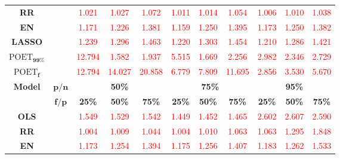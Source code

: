 \begin{table}[ht!]
{\begin{tabular*}{\textwidth}{@{\extracolsep{\fill}}ccccccccccc@{}}
\textbf{RR} &  & \textcolor{red}{1.021} & \textcolor{red}{1.027} & \textcolor{red}{1.072} & \textcolor{red}{1.011} & \textcolor{red}{1.014} & \textcolor{red}{1.054} & \textcolor{red}{1.006} & \textcolor{red}{1.010} & \textcolor{red}{1.038} \\
\textbf{EN} &  & \textcolor{red}{1.171} & \textcolor{red}{1.226} & \textcolor{red}{1.381} & \textcolor{red}{1.159} & \textcolor{red}{1.250} & \textcolor{red}{1.395} & \textcolor{red}{1.173} & \textcolor{red}{1.250} & \textcolor{red}{1.382} \\
\textbf{LASSO} &  & \textcolor{red}{1.239} & \textcolor{red}{1.296} & \textcolor{red}{1.463} & \textcolor{red}{1.220} & \textcolor{red}{1.303} & \textcolor{red}{1.454} & \textcolor{red}{1.210} & \textcolor{red}{1.286} & \textcolor{red}{1.421} \\
\textbf{$\text{POET}_{\bm{99\%}}$} &  & \textcolor{red}{12.794} & \textcolor{red}{1.582} & \textcolor{red}{1.937} & \textcolor{red}{5.515} & \textcolor{red}{1.669} & \textcolor{red}{2.256} & \textcolor{red}{2.982} & \textcolor{red}{2.346} & \textcolor{red}{2.729} \\
\textbf{$\text{POET}_{\bm{f}}$} &  & \textcolor{red}{12.794} & \textcolor{red}{14.027} & \textcolor{red}{20.858} & \textcolor{red}{6.779} & \textcolor{red}{7.809} & \textcolor{red}{11.695} & \textcolor{red}{2.856} & \textcolor{red}{3.530} & \textcolor{red}{5.670} \\
\midrule
\multirow{2}{*}{\textbf{Model}} & $\bm{p/n}$ & \multicolumn{3}{c}{\textbf{50\%}} & \multicolumn{3}{c}{\textbf{75\%}} & \multicolumn{3}{c}{\textbf{95\%}} \\
\cmidrule{3-5}
\cmidrule{6-8}
\cmidrule{9-11}
\multirow{2}{*}{} & $\bm{f/p}$ & \textbf{25\%} & \textbf{50\%} & \textbf{75\%} & \textbf{25\%} & \textbf{50\%} & \textbf{75\%} & \textbf{25\%} & \textbf{50\%} & \textbf{75\%} \\
\midrule
\textbf{OLS} &  & \textcolor{red}{1.549} & \textcolor{red}{1.529} & \textcolor{red}{1.542} & \textcolor{red}{1.449} & \textcolor{red}{1.452} & \textcolor{red}{1.465} & \textcolor{red}{2.602} & \textcolor{red}{2.607} & \textcolor{red}{2.590} \\
\textbf{RR} &  & \textcolor{red}{1.004} & \textcolor{red}{1.009} & \textcolor{red}{1.044} & \textcolor{red}{1.004} & \textcolor{red}{1.010} & \textcolor{red}{1.063} & \textcolor{red}{1.063} & \textcolor{red}{1.295} & \textcolor{red}{1.848} \\
\textbf{EN} &  & \textcolor{red}{1.173} & \textcolor{red}{1.254} & \textcolor{red}{1.394} & \textcolor{red}{1.175} & \textcolor{red}{1.256} & \textcolor{red}{1.407} & \textcolor{red}{1.183} & \textcolor{red}{1.262} & \textcolor{red}{1.533} \\

\end{tabular*}}
\end{table}
